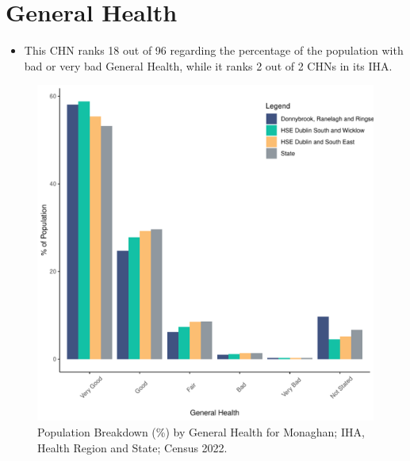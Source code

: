 \documentclass{article}
\begin{document}
\pagebreak

\section{General Health}\label{sect:GenHealth}
\begin{itemize}
\item  This CHN ranks  18 out of 96 regarding the percentage of the population with bad or very bad General Health, while it ranks   2 out of 2 CHNs in its IHA.
\end{itemize}
\begin{figure}[h]
	\centering
	\includegraphics[width = 150mm]{../figures/GenED.pdf}
	\caption{Population Breakdown (\%) by General Health for Monaghan; IHA, Health Region and State;  Census 2022.}
	\label{fig:2ae19629-1a6a-13a3-e055-000000000001}
	\end{figure}
\end{document}
